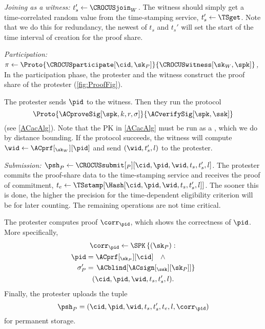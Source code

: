 \emph{Joining as a witness: \(t_s'\gets \CROCUSjoin_W\).}
The witness should simply get a time-correlated random value from the time-stamping service, \(t_s'\gets \TSget\).
Note that we do this for redundancy, the newest of \(t_s\) and \(t_s'\) will 
set the start of the time interval of creation for the proof share.


\emph{Participation: \(\pi\gets
    \Proto{\CROCUSparticipate[\cid, \sk_P]}{\CROCUSwitness[\sk_W, \spk]}\),}
In the participation phase, the protester and 
the witness construct the proof share of the protester (\cref{fig:ProofFig}).

The protester sends \(\pid\) to the witness.
Then they run the protocol \[
  \Proto{\ACproveSig[\spk, k, r, \sigma]}{\ACverifySig[\spk, \ssk]}
\] (see \cref{ACacAlg}).
Note that the \acf{PK} in \cref{ACacAlg} must be
run as a , which we do by distance bounding.
If the protocol succeeds, the witness will compute \(\wid \gets 
  \ACprf[_{\sk_W}][\pid]\) and send \((\wid, t_s', l)\) to the protester.


\emph{Submission: \(\psh_P\gets \CROCUSsubmit[_P][\cid, \pid, \wid, t_s, t_s',  l]\).}
The protester commits the proof-share data to the 
time-stamping service and receives the proof of commitment, \(t_e\gets 
  \TSstamp[\Hash[\cid, \pid, \wid, t_s, t_s', l]]\). The sooner this
  is done, the higher the precision for the time-dependent eligibility criterion
  will be for later counting. 
The remaining operations are not time critical.

The protester computes  proof \(\corr_{\pid}\), which shows the 
correctness of \(\pid\).
More specifically,
\begin{multline*}
  \corr_{\pid}\gets \SPK\left\{ (\sk_P) : \right. \\
    \begin{aligned}
      \pid &= \ACprf[_{\sk_P}][\cid] \quad \land \\
      \sigma_P' &= \left. \ACblind[\ACsign[_{\ssk}][\sk_P]] \right\}
    \end{aligned} \\
      (\cid, \pid, \wid, t_s, t_s', l).
\end{multline*}
Finally, the protester uploads the tuple \[
  \psh_P = (\cid, \pid, \wid, t_s, t_s', t_e, l, \corr_{\pid})
\] for permanent storage.

